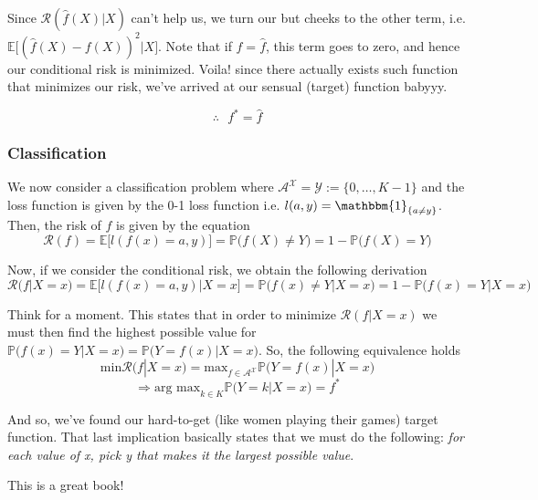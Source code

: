 \vspace{0.2cm}

Since $\mathcal{R}(\hat{f}(X)|X)$ can't help us, we turn our but cheeks to the other term, i.e. $\mathbb{E}\big[(\hat{f}(X)-f(X))^2 | X\big]$. Note that if $f=\hat{f}$, this term goes to zero, and hence our conditional risk is minimized. Voila! since there actually exists such function that minimizes our risk, we've arrived at our sensual (target) function babyyy.

$$ \therefore \text{ }f^*=\hat{f} $$

\subsubsection{Classification}
We now consider a classification problem where $\mathcal{A}^{\mathcal{X}} = \mathcal{Y} := \{0, \ldots, K-1\}$ and the loss function is given by the 0-1 loss function i.e. $l(a,y)=\mathbbm{1}_{\{a\neq y\}}$. Then, the risk of $f$ is given by the equation
$$\mathcal{R}(f) = \mathbb{E}\big[l(f(x)=a,y)\big] = \mathbb{P}\big(f(X) \neq Y\big) = 1 - \mathbb{P}\big(f(X) = Y\big)$$

Now, if we consider the conditional risk, we obtain the following derivation
$$\mathcal{R}(f|X=x) = \mathbb{E}\big[l(f(x)=a,y)|X=x\big] = \mathbb{P}\big(f(x) \neq Y|X=x\big) = 1 - \mathbb{P}\big(f(x) = Y|X=x\big)$$

Think for a moment. This states that in order to minimize $\mathcal{R}(f|X=x)$ we must then find the highest possible value for $\mathbb{P}\big(f(x) = Y|X=x\big) = \mathbb{P}\big(Y = f(x)|X=x\big)$. So, the following equivalence holds
$$\text{min}\mathcal{R}(f|X=x) = \text{max}_{f\in \mathcal{A}^{\mathcal{X}}}\mathbb{P}\big(Y = f(x)|X=x\big)$$
$$\Rightarrow \text{arg max}_{k\in K}\mathbb{P}\big(Y = k|X=x\big) = f^*$$

And so, we've found our hard-to-get (like women playing their games) target function. That last implication basically states that we must do the following: \textit{for each value of x, pick y that makes it the largest possible value}.

This is a great book!\cite{judson2019abstract}